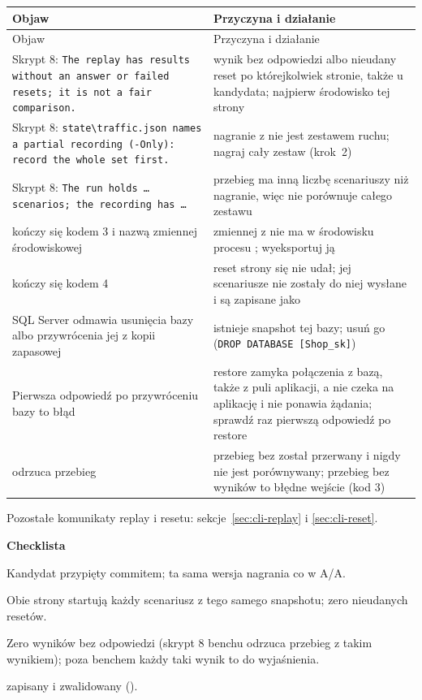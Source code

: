 \begin{xltabular}{\linewidth}{@{}>{\raggedright\arraybackslash}p{5.6cm} >{\raggedright\arraybackslash}X@{}}
\toprule
Objaw & Przyczyna i działanie \\
\midrule
\endfirsthead
\toprule
Objaw & Przyczyna i działanie \\
\midrule
\endhead
Skrypt 8: \texttt{The replay has results without an answer or failed resets; it is not a fair comparison.} & wynik bez odpowiedzi albo nieudany reset po którejkolwiek stronie, także u kandydata; najpierw środowisko tej strony \\
Skrypt 8: \texttt{state\textbackslash{}traffic.json names a partial recording (-Only): record the whole set first.} & nagranie z  nie jest zestawem ruchu; nagraj cały zestaw (krok~2) \\
Skrypt 8: \texttt{The run holds \ldots{} scenarios; the recording has \ldots{}} & przebieg ma inną liczbę scenariuszy niż nagranie, więc nie porównuje całego zestawu \\
 kończy się kodem 3 i nazwą zmiennej środowiskowej & zmiennej z  nie ma w środowisku procesu ; wyeksportuj ją \\
 kończy się kodem 4 & reset strony się nie udał; jej scenariusze nie zostały do niej wysłane i są zapisane jako  \\
SQL Server odmawia usunięcia bazy albo przywrócenia jej z kopii zapasowej & istnieje snapshot tej bazy; usuń go (\texttt{DROP DATABASE [Shop\_sk]}) \\
Pierwsza odpowiedź po przywróceniu bazy to błąd & restore zamyka połączenia z bazą, także z puli aplikacji, a  nie czeka na aplikację i nie ponawia żądania; sprawdź raz pierwszą odpowiedź po restore \\
 odrzuca przebieg & przebieg bez  został przerwany i nigdy nie jest porównywany; przebieg bez wyników to błędne wejście (kod 3) \\
\bottomrule
\end{xltabular}

Pozostałe komunikaty replay i resetu: sekcje~\ref{sec:cli-replay} i \ref{sec:cli-reset}.

\textbf{Checklista}
\begin{checklista}
  \item Kandydat przypięty commitem; ta sama wersja nagrania co w A/A.
  \item Obie strony startują każdy scenariusz z tego samego snapshotu; zero nieudanych resetów.
  \item Zero wyników bez odpowiedzi (skrypt 8 benchu odrzuca przebieg z takim wynikiem); poza
        benchem każdy taki wynik to   do
        wyjaśnienia.
  \item {} zapisany i zwalidowany ().
\end{checklista}

